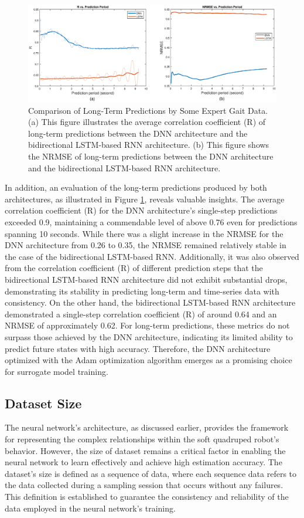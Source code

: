 \begin{figure}[htb]
    \centering
    \includegraphics[width=\linewidth]{img/chap4/long2net.eps}
    \caption{Comparison of Long-Term Predictions by Some Expert Gait Data. (a) This figure illustrates the average correlation coefficient (R) of long-term predictions between the DNN architecture and the bidirectional LSTM-based RNN architecture. (b) This figure shows the \ac{NRMSE} of long-term predictions between the DNN architecture and the bidirectional LSTM-based RNN architecture.}
    \label{fig:comp2net}
\end{figure}

In addition, an evaluation of the long-term predictions produced by both architectures, as illustrated in Figure \ref{fig:comp2net}, reveals valuable insights. The average correlation coefficient (R) for the DNN architecture's single-step predictions exceeded 0.9, maintaining a commendable level of above 0.76 even for predictions spanning 10 seconds. While there was a slight increase in the \ac{NRMSE} for the DNN architecture from 0.26 to 0.35, the \ac{NRMSE} remained relatively stable in the case of the bidirectional LSTM-based RNN. Additionally, it was also observed from the correlation coefficient (R) of different prediction steps that the bidirectional LSTM-based RNN architecture did not exhibit substantial drops, demonstrating its stability in predicting long-term and time-series data with consistency. On the other hand, the bidirectional LSTM-based RNN architecture demonstrated a single-step correlation coefficient (R) of around 0.64 and an \ac{NRMSE} of approximately 0.62. For long-term predictions, these metrics do not surpass those achieved by the DNN architecture, indicating its limited ability to predict future states with high accuracy. Therefore, the DNN architecture optimized with the Adam optimization algorithm emerges as a promising choice for surrogate model training.

\subsection{Dataset Size}
The neural network's architecture, as discussed earlier, provides the framework for representing the complex relationships within the soft quadruped robot's behavior. However, the size of dataset remains a critical factor in enabling the neural network to learn effectively and achieve high estimation accuracy. The dataset's size is defined as a sequence of data, where each sequence data refers to the data collected during a sampling session that occurs without any failures. This definition is established to guarantee the consistency and reliability of the data employed in the neural network's training.

